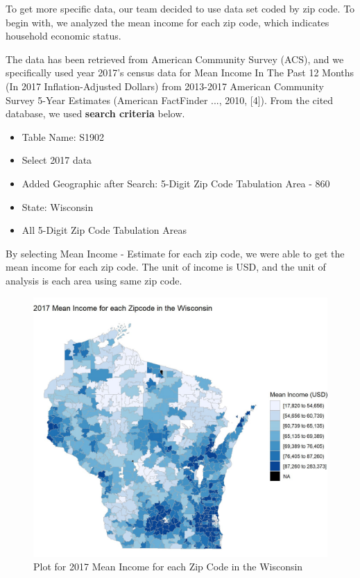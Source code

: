 \documentclass[letterpaper, 10 pt, conference]{ieeeconf}  %
\begin{document}
To get more specific data, our team decided to use data set coded by zip code.
To begin with, we analyzed the mean income for each zip code, which indicates household economic status.

The data has been retrieved from American Community Survey (ACS), and we specifically used year 2017's census data for Mean Income In The Past 12 Months (In 2017 Inflation-Adjusted Dollars) from 2013-2017 American Community Survey 5-Year Estimates (American FactFinder ..., 2010, [4]).
From the cited database, we used \textbf{search criteria} below.

\begin{itemize}

\item Table Name: S1902
\item Select 2017 data
\item Added Geographic after Search: 5-Digit Zip Code Tabulation Area - 860
\item State: Wisconsin
\item All 5-Digit Zip Code Tabulation Areas

\end{itemize}
\vspace{1\baselineskip}

By selecting Mean Income - Estimate for each zip code, we were able to get the mean income for each zip code.
The unit of income is USD, and the unit of analysis is each area using same zip code.

\begin{figure}[h]
\begin{center}
\includegraphics[width=1.0\linewidth]{2017_Mean_Income_Zipcode.jpg}
\end{center}
\caption{Plot for 2017 Mean Income for each Zip Code in the Wisconsin}
\label{fig:long}
\label{fig:onecol}
\end{figure}
\end{document}
